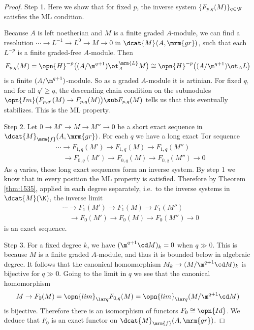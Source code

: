 \begin{proof} \mbox{}

\smallskip \noindent
Step 1. Here we show that for fixed $p$, the inverse 
system $\{ F_{p, q}(M) \}_{q \in \N}$ 
satisfies the ML condition. 

Because $A$ is left noetherian and $M$ is a finite graded $A$-module, we can 
find a resolution 
$\cdots \to L^{-1} \to L^0 \to M \to 0$
in $\dcat{M}_{}(A, \mrm{gr})$,
such that each $L^{-p}$ is a finite graded-free $A$-module. 
Then 
\[ F_{p, q}(M) = 
\opn{H}^{-p} \bigl( (A / \m^{q + 1}) \ot^{\mrm{L}}_{A} M \bigr) 
\cong \opn{H}^{-p} \bigl( (A / \m^{q + 1}) \ot_{A} L \bigr) \]
is a finite $(A / \m^{q + 1})$-module. So as a graded $A$-module it is 
artinian. 
For fixed $q$, and for all $q' \geq q$, the descending chain condition on the 
submodules
$\opn{Im} \bigl( F_{p, q'}(M) \to F_{p, q}(M) \bigr) \sub F_{p, q}(M)$
tells us that this eventually stabilizes. This is the ML property. 

\medskip \noindent
Step 2. Let 
$0 \to M' \to M \to M'' \to 0$
be a short exact sequence in $\dcat{M}_{\mrm{f}}(A, \mrm{gr})$.
For each $q$ we have a long exact Tor sequence 
\begin{equation} \label{eqn:3767}
\begin{aligned}
& \cdots \to F_{1, q}(M') \to F_{1, q}(M) \to F_{1, q}(M'') 
\\
& \quad \to F_{0, q}(M') \to F_{0, q}(M) \to F_{0, q}(M'') \to 0  
\end{aligned}
\end{equation}
As $q$ varies, these long exact sequences form an inverse system. By step 1 we 
know that in every position the ML property is satisfied. Therefore by Theorem
\ref{thm:1535}, applied in each degree separately, i.e.\ to the inverse systems 
in $\dcat{M}(\K)$, the inverse limit 
\begin{equation} \label{eqn:3768}
\begin{aligned}
& \cdots \to F_{1}(M') \to F_{1}(M) \to F_{1}(M'') 
\\
& \quad \to F_{0}(M') \to F_{0}(M) \to F_{0}(M'') \to 0  
\end{aligned}
\end{equation}
is an exact sequence. 

\medskip \noindent
Step 3. For a fixed degree $k$, we have $(\m^{q + 1} \cd M)_k = 0$
when $q \gg 0$. This is because $M$ is a finite graded $A$-module, and thus it 
is bounded below in algebraic degree. It follows that the canonical homomorphism
$M_k \to (M / \m^{q + 1} \cd M)_k$ 
is bijective for $q \gg 0$. Going to the limit in $q$ we see that the canonical 
homomorphism
\[ M \to F_0(M) =  \opn{lim}_{\lar q} F_{0, q}(M) = 
\opn{lim}_{\lar q} (M / \m^{q + 1} \cd M) \]
is bijective. Therefore there is an isomorphism of functors 
$F_0 \cong \opn{Id}$. We deduce that $F_0$ is an exact functor on 
$\dcat{M}_{\mrm{f}}(A, \mrm{gr})$. 


\end{proof}
